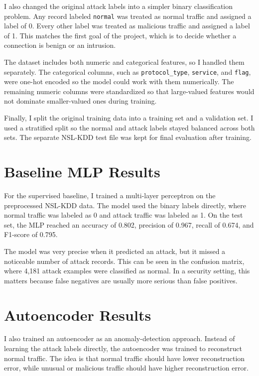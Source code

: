 \documentclass[11pt]{article}
\begin{document}
I also changed the original attack labels into a simpler binary classification problem. Any record labeled \texttt{normal} was treated as normal traffic and assigned a label of 0. Every other label was treated as malicious traffic and assigned a label of 1. This matches the first goal of the project, which is to decide whether a connection is benign or an intrusion.

The dataset includes both numeric and categorical features, so I handled them separately. The categorical columns, such as \texttt{protocol\_type}, \texttt{service}, and \texttt{flag}, were one-hot encoded so the model could work with them numerically. The remaining numeric columns were standardized so that large-valued features would not dominate smaller-valued ones during training.

Finally, I split the original training data into a training set and a validation set. I used a stratified split so the normal and attack labels stayed balanced across both sets. The separate NSL-KDD test file was kept for final evaluation after training.

\section{Baseline MLP Results}

For the supervised baseline, I trained a multi-layer perceptron on the preprocessed NSL-KDD data. The model used the binary labels directly, where normal traffic was labeled as 0 and attack traffic was labeled as 1. On the test set, the MLP reached an accuracy of 0.802, precision of 0.967, recall of 0.674, and F1-score of 0.795.

The model was very precise when it predicted an attack, but it missed a noticeable number of attack records. This can be seen in the confusion matrix, where 4,181 attack examples were classified as normal. In a security setting, this matters because false negatives are usually more serious than false positives.

\section{Autoencoder Results}

I also trained an autoencoder as an anomaly-detection approach. Instead of learning the attack labels directly, the autoencoder was trained to reconstruct normal traffic. The idea is that normal traffic should have lower reconstruction error, while unusual or malicious traffic should have higher reconstruction error.
\end{document}
